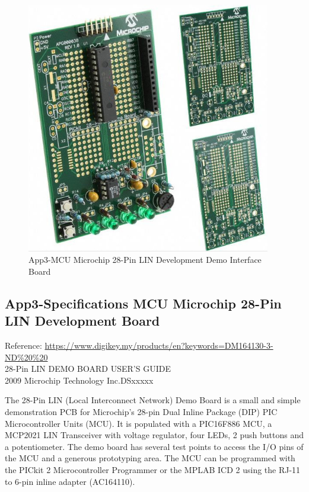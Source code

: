 \begin{figure}[htbp]
	\begin{center}
		\includegraphics[width=0.95\textwidth]{./07-images/img-Ch3App/MCU-Microchip-Dev-Demo-Board.jpg}
		\caption{App3-MCU Microchip 28-Pin LIN Development Demo Interface Board}
		\label{fig:App3-MCU-Microchip-Dev-Demo-Board.jpg}
	\end{center}
\end{figure}

\subsection{App3-Specifications MCU Microchip 28-Pin LIN Development Board}

Reference: \url{https://www.digikey.my/products/en?keywords=DM164130-3-ND\%20\%20}\\
28-Pin LIN DEMO BOARD USER'S GUIDE\\
2009 Microchip Technology Inc.DSxxxxx\\
\vspace{0.5cm}

The 28-Pin LIN (Local Interconnect Network) Demo Board is a small and simple demonstration PCB for Microchip's 28-pin Dual Inline Package (DIP) PIC Microcontroller Units (MCU). It is populated with a PIC16F886 MCU, a MCP2021 LIN Transceiver with voltage regulator, four LEDs, 2 push buttons and a potentiometer. The demo board has several test points to access the I/O pins of the MCU and a generous prototyping area. The MCU can be programmed with the PICkit 2 Microcontroller Programmer or the MPLAB ICD 2 using the RJ-11 to 6-pin inline adapter (AC164110).
\vspace{0.5cm}

